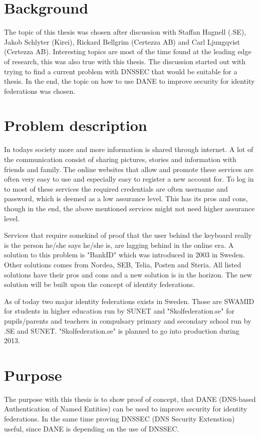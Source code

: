 \section{Background}
The topic of this thesis was chosen after discussion with Staffan Hagnell (.SE), Jakob Schlyter (Kirei), Rickard Bellgrim (Certezza AB) and Carl Ljungqvist (Certezza AB).
Interesting topics are most of the time found at the leading edge of research, this was also true with this thesis.
The discussion started out with trying to find a current problem with DNSSEC \cite{rfc:4033,rfc:4034,rfc:4035,rfc:5011} that would be suitable for a thesis.
In the end, the topic on how to use DANE \cite{rfc:6394,rfc:draft-dane} to improve security for identity federations was chosen.

\section{Problem description}
In todays society more and more information is shared through internet.
A lot of the communication consist of sharing pictures, stories and information with friends and family.
The online websites that allow and promote these services are often very easy to use and especially easy to register a new account for.
To log in to most of these services the required credentials are often username and password, which is deemed as a low assurance level\cite[p.~244]{pdf:SOU}.
This has its pros and cons, though in the end, the above mentioned services might not need higher assurance level.

Services that require somekind of proof that the user behind the keyboard really is the person he/she says he/she is, are lagging behind in the online era.
A solution to this problem is "BankID" which was introduced in 2003\cite{website:bankid-about} in Sweden.
Other solutions comes from Nordea, SEB, Telia, Posten and Steria\cite[p.~256]{pdf:SOU}.
All listed solutions have their pros and cons and a new solution is in the horizon.
The new solution will be built upon the concept of identity federations\cite[p.~23]{pdf:SOU}.

As of today two major identity federations exists in Sweden.
Those are SWAMID for students in higher education run by SUNET and "Skolfederation.se" for pupils/parents and teachers in compulsary primary and secondary school run by .SE and SUNET. "Skolfederation.se" is planned to go into production during 2013.

\section{Purpose}
The purpose with this thesis is to show proof of concept, that DANE (DNS-based Authentication of Named Entities) can be used to improve security for identity federations.
In the same time proving DNSSEC (DNS Security Extenstion) useful, since DANE is depending on the use of DNSSEC.

